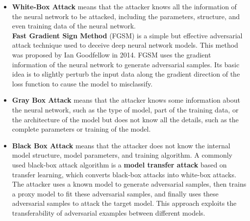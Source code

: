 \documentclass[english,version-2022-01]{uzl-thesis}
\begin{document}
\begin{itemize}
    \item \textbf{White-Box Attack} means that the attacker knows all the information of the neural network to be attacked, including the parameters, structure, and even training data of the neural network.\cite{whitebox}\\
    \textbf{Fast Gradient Sign Method} (FGSM) is a simple but effective adversarial attack technique used to deceive deep neural network models. This method was proposed by Ian Goodfellow in 2014.\cite{goodfellow2015explaining} FGSM uses the gradient information of the neural network to generate adversarial samples. Its basic idea is to slightly perturb the input data along the gradient direction of the loss function to cause the model to misclassify.
    \item  \textbf{Gray Box Attack} means that the attacker knows some information about the neural network, such as the type of model, part of the training data, or the architecture of the model but does not know all the details, such as the complete parameters or training of the model.
    \item \textbf{Black Box Attack} means that the attacker does not know the internal model structure, model parameters, and training algorithm. A commonly used black-box attack algorithm is a \textbf{model transfer attack} \cite{huang2019black} based on transfer learning, which converts black-box attacks into white-box attacks.\\
    The attacker uses a known model to generate adversarial samples, then trains a proxy model to fit these adversarial samples, and finally uses these adversarial samples to attack the target model. This approach exploits the transferability of adversarial examples between different models.
\end{itemize}
\end{document}
